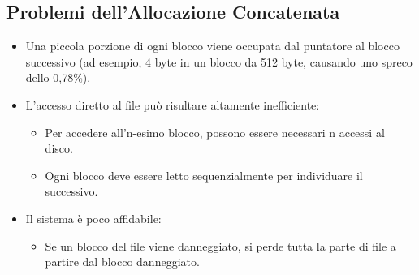 \subsection{Problemi dell’Allocazione Concatenata}
\begin{itemize}
    \item Una piccola porzione di ogni blocco viene occupata dal puntatore al blocco successivo (ad esempio, 4 byte in un blocco da 512 byte, causando uno spreco dello 0,78\%).
    \item L’accesso diretto al file può risultare altamente inefficiente:
          \begin{itemize}
              \item Per accedere all’n-esimo blocco, possono essere necessari n accessi al disco.
              \item Ogni blocco deve essere letto sequenzialmente per individuare il successivo.
          \end{itemize}
    \item Il sistema è poco affidabile: 
          \begin{itemize}
              \item Se un blocco del file viene danneggiato, si perde tutta la parte di file a partire dal blocco danneggiato.
          \end{itemize}
\end{itemize}

